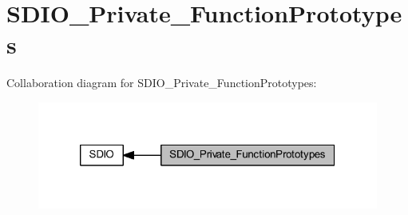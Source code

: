 \hypertarget{group___s_d_i_o___private___function_prototypes}{}\section{S\+D\+I\+O\+\_\+\+Private\+\_\+\+Function\+Prototypes}
\label{group___s_d_i_o___private___function_prototypes}
Collaboration diagram for S\+D\+I\+O\+\_\+\+Private\+\_\+\+Function\+Prototypes\+:
\nopagebreak
\begin{figure}[H]
\begin{center}
\leavevmode
\includegraphics[width=320pt]{group___s_d_i_o___private___function_prototypes}
\end{center}
\end{figure}
